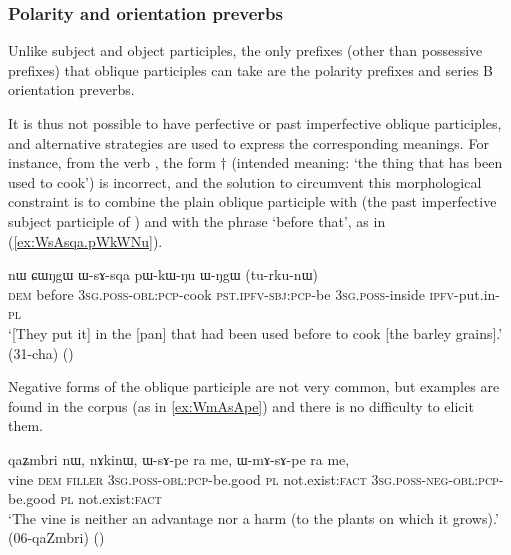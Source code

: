 \subsubsection{Polarity and orientation preverbs} \label{sec:oblique.participle.orientation}
Unlike subject and object participles, the only prefixes (other than possessive prefixes) that oblique participles can take are the polarity prefixes and series B orientation preverbs.

It is thus not possible to have perfective or past imperfective oblique participles, and alternative strategies are used to express the corresponding meanings. For instance, from the verb , the form $\dagger$ (intended meaning: `the thing that has been used to cook') is incorrect, and the solution to circumvent this morphological constraint is to combine the plain oblique participle  with  (the past imperfective subject participle of ) and with the phrase  `before that', as in (\ref{ex:WsAsqa.pWkWNu}).

\begin{exe}
\ex \label{ex:WsAsqa.pWkWNu}
\gll  nɯ ɕɯŋgɯ ɯ-sɤ-sqa pɯ-kɯ-ŋu ɯ-ŋgɯ (tu-rku-nɯ) \\
\textsc{dem} before \textsc{3sg}.\textsc{poss}-\textsc{obl}:\textsc{pcp}-cook \textsc{pst}.\textsc{ipfv}-\textsc{sbj}:\textsc{pcp}-be \textsc{3sg}.\textsc{poss}-inside \textsc{ipfv}-put.in-\textsc{pl} \\
\glt `[They put it] in the [pan] that had been used before to cook [the barley grains].' (31-cha) ()
\end{exe}

Negative forms of the oblique participle are not very common, but examples are found in the corpus (as in \ref{ex:WmAsApe}) and there is no difficulty to elicit them.

\begin{exe}
\ex \label{ex:WmAsApe}
\gll  qaʑmbri nɯ, nɤkinɯ, ɯ-sɤ-pe ra me, ɯ-mɤ-sɤ-pe ra me, \\
vine \textsc{dem} \textsc{filler} \textsc{3sg}.\textsc{poss}-\textsc{obl}:\textsc{pcp}-be.good \textsc{pl} not.exist:\textsc{fact}  \textsc{3sg}.\textsc{poss}-\textsc{neg}-\textsc{obl}:\textsc{pcp}-be.good \textsc{pl} not.exist:\textsc{fact} \\
\glt `The vine is neither an advantage nor a harm (to the plants on which it grows).' (06-qaZmbri) 	()
\end{exe}


